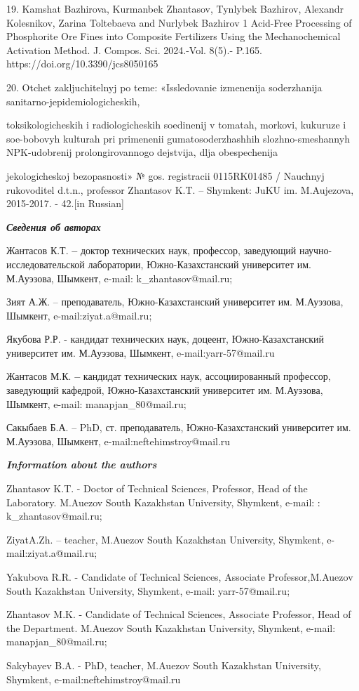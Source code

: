 \begin{noparindent}
19. Kamshat Bazhirova, Kurmanbek Zhantasov, Tynlybek Bazhirov, Alexandr
Kolesnikov, Zarina Toltebaeva and Nurlybek Bazhirov 1 Acid-Free
Processing of Phosphorite Ore Fines into Composite Fertilizers Using the
Mechanochemical Activation Method. J. Compos. Sci. 2024.-Vol. 8(5).-
P.165. https://doi.org/10.3390/jcs8050165

20. Otchet zakljuchitel\textquotesingle nyj po teme: «Issledovanie
izmenenija soderzhanija sanitarno-jepidemiologicheskih,

toksikologicheskih i radiologicheskih soedinenij v tomatah, morkovi,
kukuruze i soe-bobovyh kul\textquotesingle turah pri primenenii
gumatosoderzhashhih slozhno-smeshannyh NPK-udobrenij prolongirovannogo
dejstvija, dlja obespechenija

jekologicheskoj bezopasnosti» № gos.
registracii 0115RK01485 / Nauchnyj rukovoditel\textquotesingle{} d.t.n.,
professor Zhantasov K.T. -- Shymkent: JuKU im. M.Aujezova, 2015-2017. -
42.{[}in Russian{]}
\end{noparindent}

\emph{{\bfseries Сведения об авторах}}

\begin{noparindent}
Жантасов К.Т. {\bfseries --} доктор технических наук, профессор, заведующий
научно-исследовательской лаборатории, Южно-Казахстанский университет им.
М.Ауэзова, Шымкент, e-mail: k\_zhantasov@mail.ru;

Зият А.Ж. -- преподаватель, Южно-Казахстанский университет им.
М.Ауэзова, Шымкент, e-mail:ziyat.a@mail.ru;

Якубова Р.Р. - кандидат технических наук, доцеент, Южно-Казахстанский
университет им. М.Ауэзова, Шымкент, e-mail:yarr-57@mail.ru

Жантасов М.К. {\bfseries --} кандидат технических наук, ассоциированный
профессор, заведующий кафедрой, Южно-Казахстанский университет им.
М.Ауэзова, Шымкент, e-mail: manapjan\_80@mail.ru;

Сакыбаев Б.А. -- PhD, ст. преподаватель, Южно-Казахстанский университет
им. М.Ауэзова, Шымкент, e-mail:neftehimstroy@mail.ru
\end{noparindent}

\emph{{\bfseries Information about the authors}}

\begin{noparindent}
Zhantasov K.T. - Doctor of Technical Sciences, Professor, Head of the
Laboratory. M.Auezov South Kazakhstan University, Shymkent, e-mail: :
k\_zhantasov@mail.ru;

ZiyatA.Zh. -- teacher, M.Auezov South Kazakhstan University, Shymkent,
e-mail:ziyat.a@mail.ru;

Yakubova R.R. - Candidate of Technical Sciences, Associate
Professor,M.Auezov South Kazakhstan University, Shymkent, e-mail:
yarr-57@mail.ru;

Zhantasov M.K. - Candidate of Technical Sciences, Associate Professor,
Head of the Department. M.Auezov South Kazakhstan University, Shymkent,
e-mail: manapjan\_80@mail.ru;

Sakybayev B.A. - PhD, teacher, M.Auezov South Kazakhstan University,
Shymkent, e-mail:neftehimstroy@mail.ru
\end{noparindent}
